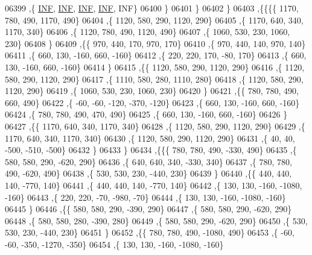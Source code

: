 \begin{DoxyCode}
06399     ,\{   \hyperlink{constants_8h_a12c2040f25d8e3a7b9e1c2024c618cb6}{INF},   \hyperlink{constants_8h_a12c2040f25d8e3a7b9e1c2024c618cb6}{INF},   \hyperlink{constants_8h_a12c2040f25d8e3a7b9e1c2024c618cb6}{INF},   \hyperlink{constants_8h_a12c2040f25d8e3a7b9e1c2024c618cb6}{INF},   INF\}
06400     \}
06401    \}
06402   \}
06403  ,\{\{\{\{  1170,   780,   490,  1170,   490\}
06404     ,\{  1120,   580,   290,  1120,   290\}
06405     ,\{  1170,   640,   340,  1170,   340\}
06406     ,\{  1120,   780,   490,  1120,   490\}
06407     ,\{  1060,   530,   230,  1060,   230\}
06408     \}
06409    ,\{\{   970,   440,   170,   970,   170\}
06410     ,\{   970,   440,   140,   970,   140\}
06411     ,\{   660,   130,  -160,   660,  -160\}
06412     ,\{   220,   220,   170,   -80,   170\}
06413     ,\{   660,   130,  -160,   660,  -160\}
06414     \}
06415    ,\{\{  1120,   580,   290,  1120,   290\}
06416     ,\{  1120,   580,   290,  1120,   290\}
06417     ,\{  1110,   580,   280,  1110,   280\}
06418     ,\{  1120,   580,   290,  1120,   290\}
06419     ,\{  1060,   530,   230,  1060,   230\}
06420     \}
06421    ,\{\{   780,   780,   490,   660,   490\}
06422     ,\{   -60,   -60,  -120,  -370,  -120\}
06423     ,\{   660,   130,  -160,   660,  -160\}
06424     ,\{   780,   780,   490,   470,   490\}
06425     ,\{   660,   130,  -160,   660,  -160\}
06426     \}
06427    ,\{\{  1170,   640,   340,  1170,   340\}
06428     ,\{  1120,   580,   290,  1120,   290\}
06429     ,\{  1170,   640,   340,  1170,   340\}
06430     ,\{  1120,   580,   290,  1120,   290\}
06431     ,\{    40,    40,  -500,  -510,  -500\}
06432     \}
06433    \}
06434   ,\{\{\{   780,   780,   490,  -330,   490\}
06435     ,\{   580,   580,   290,  -620,   290\}
06436     ,\{   640,   640,   340,  -330,   340\}
06437     ,\{   780,   780,   490,  -620,   490\}
06438     ,\{   530,   530,   230,  -440,   230\}
06439     \}
06440    ,\{\{   440,   440,   140,  -770,   140\}
06441     ,\{   440,   440,   140,  -770,   140\}
06442     ,\{   130,   130,  -160, -1080,  -160\}
06443     ,\{   220,   220,   -70,  -980,   -70\}
06444     ,\{   130,   130,  -160, -1080,  -160\}
06445     \}
06446    ,\{\{   580,   580,   290,  -390,   290\}
06447     ,\{   580,   580,   290,  -620,   290\}
06448     ,\{   580,   580,   280,  -390,   280\}
06449     ,\{   580,   580,   290,  -620,   290\}
06450     ,\{   530,   530,   230,  -440,   230\}
06451     \}
06452    ,\{\{   780,   780,   490, -1080,   490\}
06453     ,\{   -60,   -60,  -350, -1270,  -350\}
06454     ,\{   130,   130,  -160, -1080,  -160\}

\end{DoxyCode}
